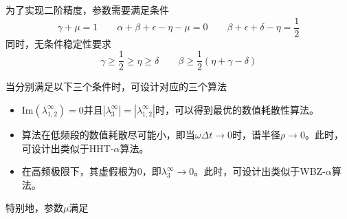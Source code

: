 为了实现二阶精度，参数需要满足条件
\begin{equation}
\gamma+\mu=1\qquad\alpha+\beta+\epsilon-\eta-\mu=0\qquad\beta+\epsilon+\delta-\eta=\frac{1}{2}
\end{equation}
同时，无条件稳定性要求
\begin{equation}
\gamma\ge\frac{1}{2}\ge\eta\ge\delta\qquad\beta\ge\frac{1}{2}(\eta+\gamma-\delta)
\end{equation}

当分别满足以下三个条件时，可设计对应的三个算法
\begin{itemize}
\item[\ddag] Im$(\lambda_{1,2}^{\infty})=0$并且$|\lambda_3^{\infty}|=|\lambda_{1,2}^{\infty}|$时，可以得到最优的数值耗散性算法。
\item[\ddag] 算法在低频段的数值耗散尽可能小，即当$\omega\Delta t\to0$时，谱半径$\rho\to0$。此时，可设计出类似于HHT-$\alpha$算法。
\item[\ddag] 在高频极限下，其虚假根为0，即$\lambda_3^{\infty}\to0$。此时，可设计出类似于WBZ-$\alpha$算法。
\end{itemize}

特别地，参数$\mu$满足

